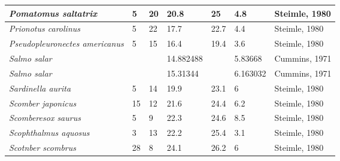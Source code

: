 \documentclass[a4paper]{article} %
\begin{document}
\begin{landscape}
\begin{longtable}[]{|l|p{1.8cm}|p{2cm}|p{2cm}|p{2.15cm}|p{1.9cm}|l|}
    \textit{Pomatomus saltatrix}             & 5                            & 20                         & 20.8                          & 25                                & 4.8                      & Steimle, 1980                \\ \hline
    \textit{Prionotus carolinus}             & 5                            & 22                         & 17.7                          & 22.7                              & 4.4                      & Steimle, 1980                \\ \hline
    \textit{Pseudopleuronectes americanus}   & 5                            & 15                         & 16.4                          & 19.4                              & 3.6                      & Steimle, 1980                \\ \hline
    \textit{Salmo salar}                     &                              &                            & 14.882488                     &                                   & 5.83668                  & Cummins, 1971 \\ \hline
    \textit{Salmo salar}                     &                              &                            & 15.31344                      &                                   & 6.163032                 & Cummins, 1971 \\ \hline
    \textit{Sardinella aurita}               & 5                            & 14                         & 19.9                          & 23.1                              & 6                        & Steimle, 1980                \\ \hline
    \textit{Scomber japonicus}               & 15                           & 12                         & 21.6                          & 24.4                              & 6.2                      & Steimle, 1980                \\ \hline
    \textit{Scomberesox saurus}              & 5                            & 9                          & 22.3                          & 24.6                              & 8.5                      & Steimle, 1980                \\ \hline
    \textit{Scophthalmus aquosus}            & 3                            & 13                         & 22.2                          & 25.4                              & 3.1                      & Steimle, 1980                \\ \hline
    \textit{Scotnber scombrus}               & 28                           & 8                          & 24.1                          & 26.2                              & 6                        & Steimle, 1980                \\ \hline

\end{longtable}
\end{landscape}
\end{document}
